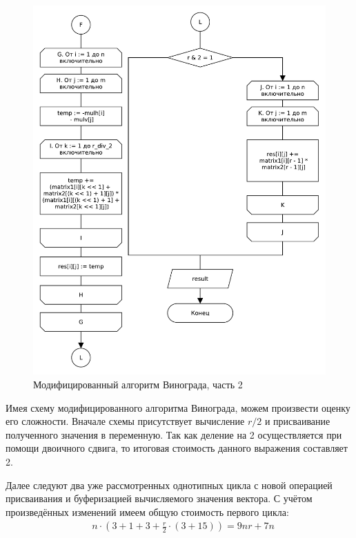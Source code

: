 \begin{figure}[H]
    \centering
    \includegraphics[scale=0.75]{pdf/owinograd-part2.pdf}
    \caption{Модифицированный алгоритм Винограда, часть 2}
\end{figure}

Имея схему модифицированного алгоритма Винограда, можем произвести оценку его сложности. Вначале схемы присутствует вычисление $r/2$ и присваивание полученного значения в переменную. Так как деление на 2 осуществляется при помощи двоичного сдвига, то итоговая стоимость данного выражения составляет 2.

Далее следуют два уже рассмотренных однотипных цикла с новой операцией присваивания и буферизацией вычисляемого значения вектора. С учётом произведённых изменений имеем общую стоимость первого цикла:
\begin{equation}
    \begin{split}
    & n \cdot{} (3 + 1 + 3 + \frac{r}{2} \cdot{} (3 + 15)) = 9nr + 7n
    \end{split}
\end{equation}

